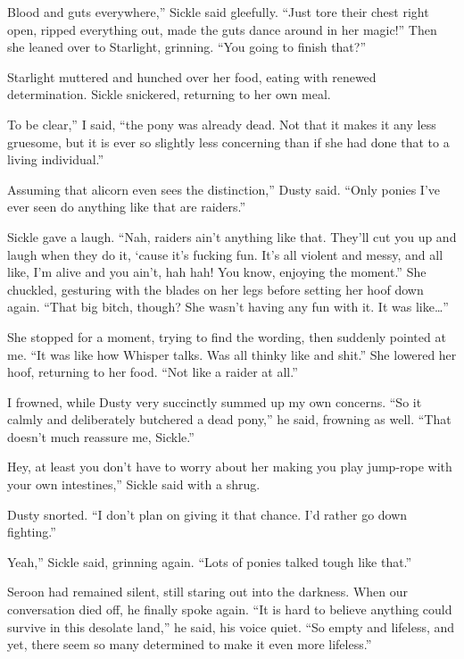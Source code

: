 \leavevmode{}Blood and guts everywhere,” Sickle said gleefully. “Just tore their chest right open, ripped everything out, made the guts dance around in her magic!” Then she leaned over to Starlight, grinning. “You going to finish that?”

Starlight muttered and hunched over her food, eating with renewed determination. Sickle snickered, returning to her own meal.

\leavevmode{}To be clear,” I said, “the pony was already dead. Not that it makes it any less gruesome, but it is ever so slightly less concerning than if she had done that to a living individual.”

\leavevmode{}Assuming that alicorn even sees the distinction,” Dusty said. “Only ponies I’ve ever seen do anything like that are raiders.”

Sickle gave a laugh. “Nah, raiders ain’t anything like that. They’ll cut you up and laugh when they do it, ‘cause it’s fucking fun. It’s all violent and messy, and all like, I’m alive and you ain’t, hah hah! You know, enjoying the moment.” She chuckled, gesturing with the blades on her legs before setting her hoof down again. “That big bitch, though? She wasn’t having any fun with it. It was like…”

She stopped for a moment, trying to find the wording, then suddenly pointed at me. “It was like how Whisper talks. Was all thinky like and shit.” She lowered her hoof, returning to her food. “Not like a raider at all.”

I frowned, while Dusty very succinctly summed up my own concerns. “So it calmly and deliberately butchered a dead pony,” he said, frowning as well. “That doesn’t much reassure me, Sickle.”

\leavevmode{}Hey, at least you don’t have to worry about her making you play jump-rope with your own intestines,” Sickle said with a shrug.

Dusty snorted. “I don’t plan on giving it that chance. I’d rather go down fighting.”

\leavevmode{}Yeah,” Sickle said, grinning again. “Lots of ponies talked tough like that.”

Seroon had remained silent, still staring out into the darkness. When our conversation died off, he finally spoke again. “It is hard to believe anything could survive in this desolate land,” he said, his voice quiet. “So empty and lifeless, and yet, there seem so many determined to make it even more lifeless.”

